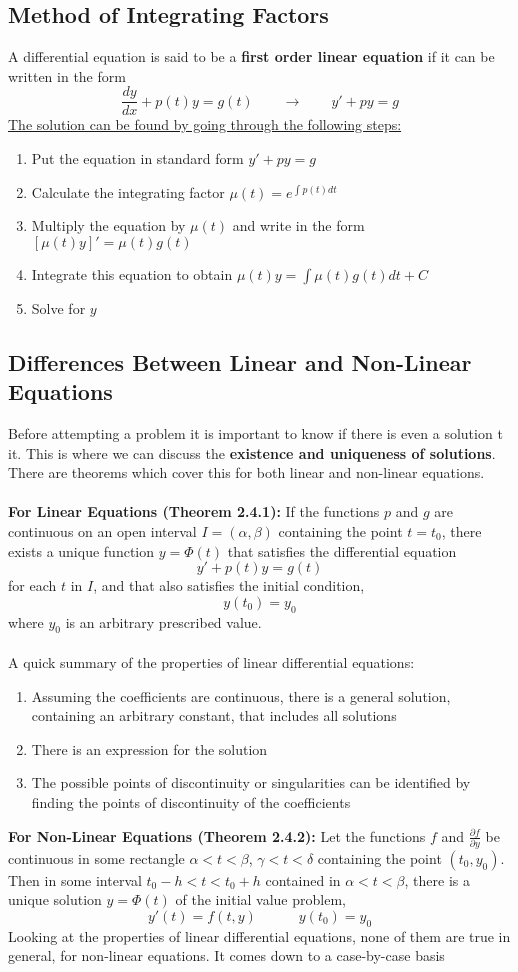 \documentclass[11pt]{article}
\begin{document}
\subsection{Method of Integrating Factors}
A differential equation is said to be a \textbf{first order linear equation} if it can be written in the form
$$\frac{dy}{dx} + p(t)y = g(t) \quad \quad \rightarrow \quad \quad y' +py = g$$
\underline{The solution can be found by going through the following steps:}
\begin{enumerate}
\item Put the equation in standard form $y' +py =g$
\item Calculate the integrating factor $\mu (t) = e^{\int p(t)dt}$
\item Multiply the equation by $\mu (t)$ and write in the form $[\mu (t)y]' = \mu (t)g(t)$
\item Integrate this equation to obtain $ \mu (t)y = \int \mu(t)g(t)dt + C$
\item Solve for $y$
\end{enumerate}
\subsection{Differences Between Linear and Non-Linear Equations}
Before attempting a problem it is important to know if there is even a solution t it. This is where we can discuss the \textbf{existence and uniqueness of solutions}. There are theorems which cover this for both linear and non-linear equations.\\ \\
\textbf{For Linear Equations (Theorem 2.4.1):}
If the functions $p$ and $g$ are continuous on an open interval $I = (\alpha, \beta)$ containing the point $t = t_0$, there exists a unique function $y = \Phi(t)$ that satisfies the differential equation
$$ y' + p(t)y = g(t)$$
for each $t$ in $I$, and that also satisfies the initial condition,
$$y(t_0) = y_0$$
where $y_0$ is an arbitrary prescribed value. \\\\
A quick summary of the properties of linear differential equations:
\begin{enumerate}
\item Assuming the coefficients are continuous, there is a general solution, containing an arbitrary constant, that includes all solutions
\item There is an expression for the solution
\item The possible points of discontinuity or singularities can be identified by finding the points of discontinuity of the coefficients
\end{enumerate}
\textbf{For Non-Linear Equations (Theorem 2.4.2):} Let the functions $f$ and $\frac{\partial f}{\partial y}$ be continuous in some rectangle $ \alpha < t < \beta $, $\gamma < t < \delta$ containing the point $(t_0, y_0)$. Then in some interval $t_0 - h < t < t_0 + h$ contained in $\alpha < t < \beta$, there is a unique solution $y=\Phi(t)$ of the initial value problem,
$$y'(t) = f(t, y) \quad \quad \quad y(t_0) = y_0$$
Looking at the properties of linear differential equations, none of them are true in general, for non-linear equations. It comes down to a case-by-case basis
\end{document}
